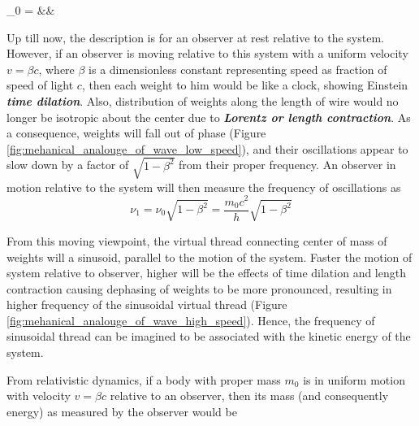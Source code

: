 \documentclass[11pt, a4paper]{article}
\begin{document}
	\begin{flalign}\label{eq:proper_freq_to_rest_energy}
		 \quad \nu_{0} = &&
	\end{flalign}
	
	Up till now, the description is for an observer at rest relative to the system. However, if an observer is moving relative to this system with a uniform velocity $v = \beta c$, where $\beta$ is a dimensionless constant representing speed as fraction of speed of light $c$, then each weight to him would be like a clock, showing Einstein \textbf{\textit{time dilation}}. Also, distribution of weights along the length of wire would no longer be isotropic about the center due to \textbf{\textit{Lorentz or length contraction}}. As a consequence, weights will fall out of phase (Figure \ref{fig:mehanical_analouge_of_wave_low_speed}), and their oscillations appear to slow down by a factor of $\sqrt{1 - \beta^{2}}$ from their proper frequency. An observer in motion relative to the system will then measure the frequency of oscillations as
	\begin{equation}\label{eq:relaativistic_oscillation_freq}
		\nu_{1} = \nu_{0}\sqrt{1 - \beta^{2}} = \frac{m_{0}c^{2}}{h}\sqrt{1 - \beta^{2}}
	\end{equation}
	
	From this moving viewpoint, the virtual thread connecting center of mass of weights will a sinusoid, parallel to the motion of the system. Faster the motion of system relative to observer, higher will be the effects of time dilation and length contraction causing dephasing of weights to be more pronounced, resulting in higher frequency of the sinusoidal virtual thread (Figure \ref{fig:mehanical_analouge_of_wave_high_speed}). Hence, the frequency of sinusoidal thread can be imagined to be associated with the kinetic energy of the system.
	
	From relativistic dynamics, if a body with proper mass $m_{0}$ is in uniform motion with velocity $v = \beta c$ relative to an observer, then its mass (and consequently energy) as measured by the observer would be
	
\end{document}
